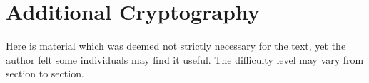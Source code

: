 \chapter{Additional Cryptography}
\label{app:crypto}

Here is material which was deemed not strictly necessary for the text,
yet the author felt some individuals may find it useful.
The difficulty level may vary from section to section.



